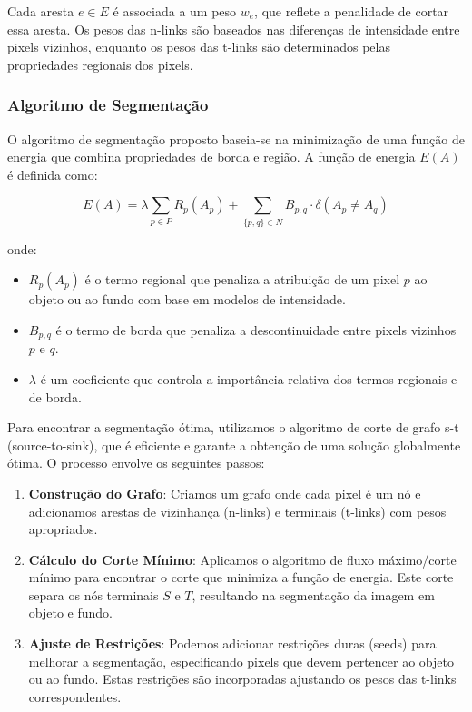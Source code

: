 \documentclass[12pt]{article}
\begin{document}
Cada aresta \( e \in E \) é associada a um peso \( w_e \), que reflete a penalidade de cortar essa aresta. Os pesos das n-links são baseados nas diferenças de intensidade entre pixels vizinhos, enquanto os pesos das t-links são determinados pelas propriedades regionais dos pixels.

\subsubsection{Algoritmo de Segmentação}

O algoritmo de segmentação proposto baseia-se na minimização de uma função de energia que combina propriedades de borda e região. A função de energia \( E(A) \) é definida como:

\[
E(A) = \lambda \sum_{p \in P} R_p(A_p) + \sum_{\{p,q\} \in N} B_{p,q} \cdot \delta(A_p \neq A_q)
\]

onde:
\begin{itemize}
    \item \( R_p(A_p) \) é o termo regional que penaliza a atribuição de um pixel \( p \) ao objeto ou ao fundo com base em modelos de intensidade.
    \item \( B_{p,q} \) é o termo de borda que penaliza a descontinuidade entre pixels vizinhos \( p \) e \( q \).
    \item \( \lambda \) é um coeficiente que controla a importância relativa dos termos regionais e de borda.
\end{itemize}

Para encontrar a segmentação ótima, utilizamos o algoritmo de corte de grafo s-t (source-to-sink), que é eficiente e garante a obtenção de uma solução globalmente ótima. O processo envolve os seguintes passos:

\begin{enumerate}
    \item \textbf{Construção do Grafo}: Criamos um grafo onde cada pixel é um nó e adicionamos arestas de vizinhança (n-links) e terminais (t-links) com pesos apropriados.
    \item \textbf{Cálculo do Corte Mínimo}: Aplicamos o algoritmo de fluxo máximo/corte mínimo para encontrar o corte que minimiza a função de energia. Este corte separa os nós terminais \( S \) e \( T \), resultando na segmentação da imagem em objeto e fundo.
    \item \textbf{Ajuste de Restrições}: Podemos adicionar restrições duras (seeds) para melhorar a segmentação, especificando pixels que devem pertencer ao objeto ou ao fundo. Estas restrições são incorporadas ajustando os pesos das t-links correspondentes.
\end{enumerate}
\end{document}
